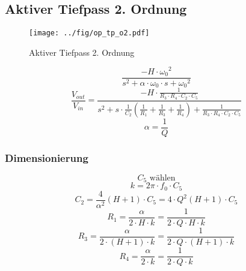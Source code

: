 



\subsection{Aktiver Tiefpass 2. Ordnung}
\label{filt:o2-tp}
\begin{figure}[h!]
	\centering
	\texttt{[image: ../fig/op\_tp\_o2.pdf]}
	\caption{Aktiver Tiefpass 2. Ordnung}
	\label{sch:op-tp-o2}
\end{figure}
\[ \frac{-H \cdot {\omega_0}^2}
{s^2 + \alpha \cdot \omega_0 \cdot s + {\omega_0}^2} \]
\[ \frac{V_{out}}{V_{in}} 
= \frac{-H \cdot \frac{1}{R_3 \cdot R_4 \cdot C_2 \cdot C_5}}
{s^2 + s \cdot \frac{1}{C_2} 
\left(\frac{1}{R_1} + \frac{1}{R_3} + \frac{1}{R_4}\right) 
+ \frac{1}{R_3 \cdot R_4 \cdot C_2 \cdot C_5}} \]
\[ \alpha = \frac{1}{Q} \]

\subsubsection{Dimensionierung}
\[ C_5 \text{ wählen} \]
\[ k = 2 \pi \cdot f_0 \cdot C_5 \]
\[ C_2 = \frac{4}{\alpha^2} (H + 1) \cdot C_5 
= 4 \cdot Q^2 (H + 1) \cdot C_5 \]
\[ R_1 = \frac{\alpha}{2 \cdot H \cdot k} 
= \frac{1}{2 \cdot Q \cdot H \cdot k} \]
\[ R_3 = \frac{\alpha}{2 \cdot (H + 1) \cdot k} 
= \frac{1}{2 \cdot Q \cdot (H + 1) \cdot k} \]
\[ R_4 = \frac{\alpha}{2 \cdot k} = \frac{1}{2 \cdot Q \cdot k} \]
